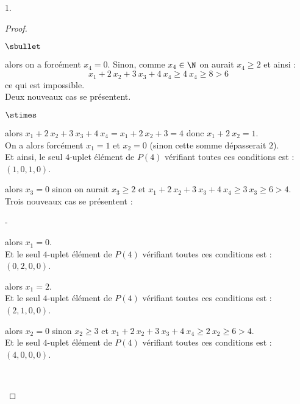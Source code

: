 \begin{noliste}{1.}
\begin{proof}
\begin{noliste}{$\sbullet$}
      \item {} alors on a forcément $x_4 =
        0$. Sinon, comme $x_4 \in \N$ on aurait $x_4 \geq 2$ et ainsi
        :
        \[
        x_1 + 2 \ x_2 + 3 \ x_3 + 4 \ x_4 \geq 4 \ x_4 \geq 8 > 6
        \]
        ce qui est impossible.\\
        Deux nouveaux cas se présentent.
        \begin{noliste}{$\stimes$}
        \item {} alors $x_1 + 2 \ x_2 + 3 \ x_3
          + 4 \ x_4 = x_1 + 2 \ x_2 + 3 = 4$ donc $x_1 + 2 \ x_2 = 1$.\\
          On a alors forcément $x_1 = 1$ et $x_2 = 0$ (sinon cette
          somme dépasserait $2$).\\
          Et ainsi, le seul $4$-uplet élément de $P(4)$ vérifiant
          toutes ces conditions est : $(1, 0, 1, 0)$.

        \item {} alors $x_3 = 0$ sinon on
          aurait $x_3 \geq 2$ et $x_1 + 2 \ x_2 + 3 \ x_3 + 4 \ x_4 
          \geq 3 \ x_3 \geq 6 > 4$.\\
          Trois nouveaux cas se présentent :
          \begin{noliste}{-}
          \item {} alors $x_1 = 0$.\\
            Et le seul $4$-uplet élément de $P(4)$ vérifiant toutes
            ces conditions est : $(0, 2, 0, 0)$.
          \item {} alors $x_1 = 2$.\\
            Et le seul $4$-uplet élément de $P(4)$ vérifiant toutes
            ces conditions est : $(2, 1, 0, 0)$.
          \item {} alors $x_2 = 0$
            sinon $x_2 \geq 3$ et $x_1 + 2 \ x_2 + 3 \ x_3 +
            4 \ x_4 \geq 2 \ x_2 \geq 6 > 4$.\\
            Et le seul $4$-uplet élément de $P(4)$ vérifiant toutes
            ces conditions est : $(4, 0, 0, 0)$.            
          \end{noliste}          
        \end{noliste}
        ~\\[-1.4cm] 
      \end{noliste}
    \end{proof}



\end{noliste}
